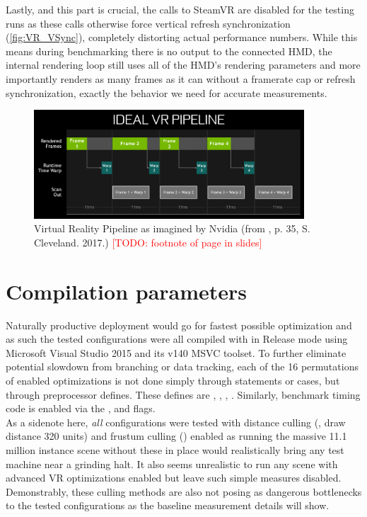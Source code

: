 Lastly, and this part is crucial, the  calls to SteamVR are disabled for the testing runs as these calls otherwise force vertical refresh synchronization (\autoref{fig:VR_VSync}), completely distorting actual performance numbers. While this means during benchmarking there is no output to the connected HMD, the internal rendering loop still uses all of the HMD's rendering parameters and more importantly renders as many frames as it can without a framerate cap or refresh synchronization, exactly the behavior we need for accurate measurements. 

\begin{figure}[htb]
  \centering
  \includegraphics[width=0.9\textwidth]{pictures/Nvidia_FCAT}
  \caption{Virtual Reality Pipeline as imagined by Nvidia (from \cite{Cleveland.2017}, p. 35, S. Cleveland. 2017.) \textcolor{red}{[TODO: footnote of page in slides]}} \label{fig:VR_VSync}
\end{figure} 

\section{Compilation parameters}
Naturally productive deployment would go for fastest possible optimization and as such the tested configurations were all compiled with  in Release mode using Microsoft Visual Studio 2015 and its v140 MSVC toolset. 
To further eliminate potential slowdown from branching or data tracking, each of the 16 permutations of enabled optimizations is not done simply through  statements or  cases, but through preprocessor defines. These defines are , , , . Similarly, benchmark timing code is enabled via the ,  and  flags. \\
As a sidenote here, \textit{all} configurations were tested with distance culling (, draw distance 320 units) and frustum culling () enabled as running the massive 11.1 million instance scene without these in place would realistically bring any test machine near a grinding halt. It also seems unrealistic to run any scene with advanced VR optimizations enabled but leave such simple measures disabled. 
Demonstrably, these culling methods are also not posing as dangerous bottlenecks to the tested configurations as the baseline measurement details will show. 

